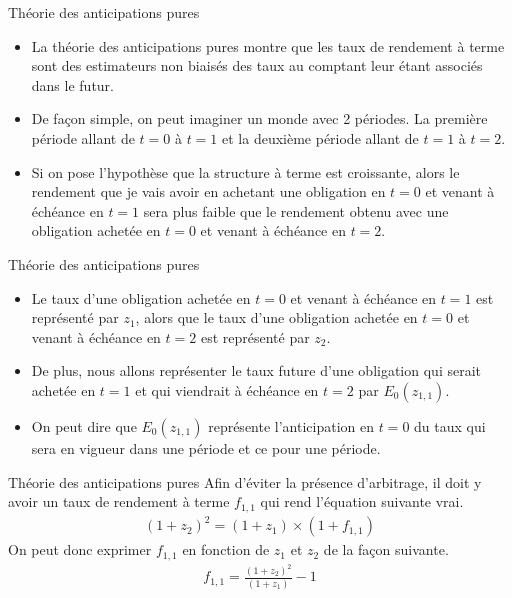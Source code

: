 \documentclass[11pt]{beamer}
\begin{document}
\begin{frame}{Théorie des anticipations pures}
\begin{itemize}
\item La théorie des anticipations pures montre que les taux de rendement à terme sont des estimateurs non biaisés des taux au comptant leur étant associés dans le futur. 
\item De façon simple, on peut imaginer un monde avec 2 périodes. La première période allant de $t=0$ à $t=1$ et la deuxième période allant de $t=1$ à $t=2$.
\item Si on pose l'hypothèse que la structure à terme est croissante,  alors le rendement que je vais avoir en achetant une obligation en $t=0$ et venant à échéance en $t=1$ sera plus faible que le rendement obtenu avec une obligation achetée en $t=0$ et venant à échéance en $t=2$.  
\end{itemize}
\end{frame}


\begin{frame}{Théorie des anticipations pures}
\begin{itemize}
\item Le taux d'une obligation achetée en $t=0$ et venant à échéance en $t=1$ est représenté par $z_{1}$,  alors que le taux d'une obligation achetée en $t=0$ et venant à échéance en $t=2$ est représenté par $z_{2}$. 
\item De plus, nous allons représenter le taux future d'une obligation qui serait achetée en $t=1$ et qui viendrait à échéance en $t=2$ par $E_0(z_{1,1})$.  
\item On peut dire que $E_0(z_{1,1})$ représente l'anticipation en $t=0$ du taux qui sera en vigueur dans une période et ce pour une période. 
\end{itemize}
\end{frame}



\begin{frame}{Théorie des anticipations pures}
Afin d'éviter la présence d'arbitrage, il doit y avoir un taux de rendement à terme $f_{1,1}$ qui rend l'équation suivante vrai.
\begin{align*}
(1+z_2)^2=(1+z_1) \times (1+f_{1,1})
\end{align*}
On peut donc exprimer $f_{1,1}$ en fonction de $z_1$ et $z_2$ de la façon suivante.
\begin{align*}
f_{1,1}=\frac{(1+z_2)^2}{(1+z_1)}-1
\end{align*}
\end{frame}
\end{document}
